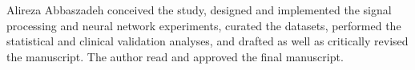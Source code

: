 Alireza Abbaszadeh conceived the study, designed and implemented the signal processing and neural network experiments, curated the datasets, performed the statistical and clinical validation analyses, and drafted as well as critically revised the manuscript. The author read and approved the final manuscript.
